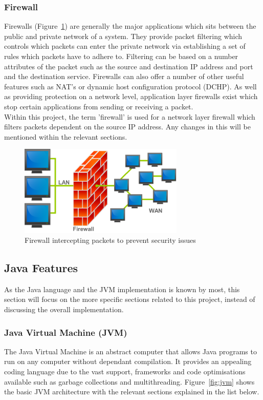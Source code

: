 \documentclass[a4paper, titlepage]{article}
\begin{document}
\subsubsection{Firewall}
Firewalls (Figure~\ref{fig:firewall}) are generally the major applications which sits between the public and private network of a system. They provide packet filtering which controls which packets can enter the private network via establishing a set of rules which packets have to adhere to. Filtering can be based on a number attributes of the packet such as the source and destination IP address and port and the destination service. Firewalls can also offer a number of other useful features such as NAT's or dynamic host configuration protocol (DCHP). As well as providing protection on a network level, application layer firewalls exist which stop certain applications from sending or receiving a packet. \\
\newline
Within this project, the term 'firewall' is used for a network layer firewall which filters packets dependent on the source IP address. Any changes in this will be mentioned within the relevant sections. \\

\begin{figure}[H]
	\centering
	\includegraphics[width=0.7\textwidth]{images/firewall.png}
	\caption{Firewall intercepting packets to prevent security issues}
	\label{fig:firewall}
\end{figure}

\subsection{Java Features}
As the Java language and the JVM implementation is known by most, this section will focus on the more specific sections related to this project, instead of discussing the overall implementation.

\subsubsection{Java Virtual Machine (JVM)}
The Java Virtual Machine is an abstract computer that allows Java programs to run on any computer without dependant compilation. It provides an appealing coding language due to the vast support, frameworks and code optimisations available such as garbage collections and multithreading. Figure~\ref{fig:jvm} shows the basic JVM architecture with the relevant sections explained in the list below.
\end{document}
